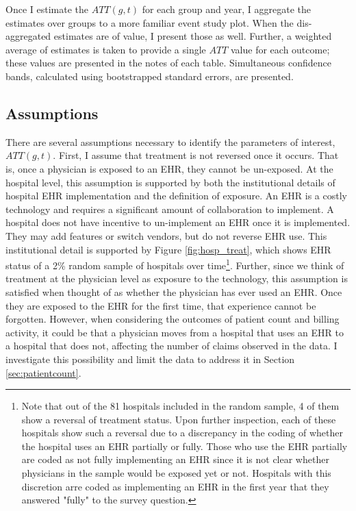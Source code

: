 \documentclass[11pt]{article}
\begin{document}
Once I estimate the $ATT(g,t)$ for each group and year, I aggregate the estimates over groups to a more familiar event study plot. When the dis-aggregated estimates are of value, I present those as well. Further, a weighted average of estimates is taken to provide a single $ATT$ value for each outcome; these values are presented in the notes of each table. Simultaneous confidence bands, calculated using bootstrapped standard errors, are presented. 

\subsection{Assumptions}

There are several assumptions necessary to identify the parameters of interest, $ATT(g,t)$. First, I assume that treatment is not reversed once it occurs. That is, once a physician is exposed to an EHR, they cannot be un-exposed. At the hospital level, this assumption is supported by both the institutional details of hospital EHR implementation and the definition of exposure. An EHR is a costly technology and requires a significant amount of collaboration to implement. A hospital does not have incentive to un-implement an EHR once it is implemented. They may add features or switch vendors, but do not reverse EHR use. This institutional detail is supported by Figure \ref{fig:hosp_treat}, which shows EHR status of a 2\% random sample of hospitals over time\footnote{Note that out of the 81 hospitals included in the random sample, 4 of them show a reversal of treatment status. Upon further inspection, each of these hospitals show such a reversal due to a discrepancy in the coding of whether the hospital uses an EHR partially or fully. Those who use the EHR partially are coded as not fully implementing an EHR since it is not clear whether physicians in the sample would be exposed yet or not. Hospitals with this discretion arre coded as implementing an EHR in the first year that they answered "fully" to the survey question.}. Further, since we think of treatment at the physician level as exposure to the technology, this assumption is satisfied when thought of as whether the physician has ever used an EHR. Once they are exposed to the EHR for the first time, that experience cannot be forgotten. However, when considering the outcomes of patient count and billing activity, it could be that a physician moves from a hospital that uses an EHR to a hospital that does not, affecting the number of claims observed in the data. I investigate this possibility and limit the data to address it in Section \ref{sec:patientcount}. 
\end{document}
